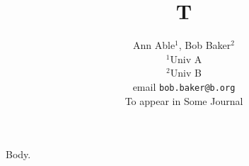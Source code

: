 \documentclass{article}
\begin{document}
\title{T}
\author{Ann Able$^1$, Bob Baker$^2$\\
$^1$Univ A\\
$^2$Univ B\\
email \texttt{bob.baker@b.org}\\
To appear in Some Journal}
\maketitle
Body.
\end{document}
